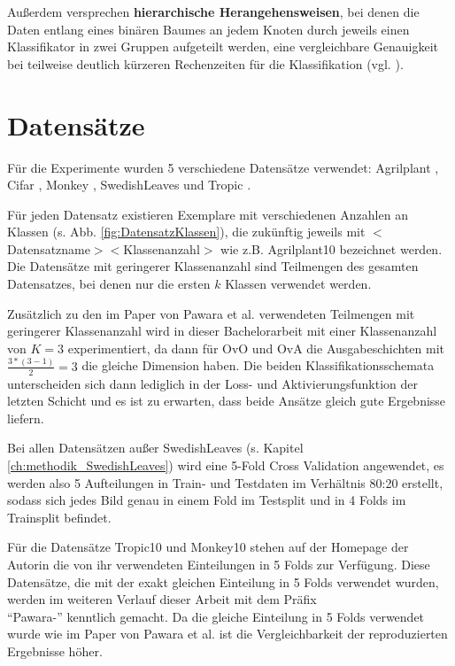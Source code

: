 Außerdem versprechen \textbf{hierarchische Herangehensweisen}, bei denen die Daten entlang eines binären Baumes an jedem Knoten durch jeweils einen Klassifikator in zwei Gruppen aufgeteilt werden, eine vergleichbare Genauigkeit bei teilweise deutlich kürzeren Rechenzeiten für die Klassifikation (vgl. \cite{hierarchischeMethoden}).

\newpage
\section{Datensätze}
\label{ch:methodik_datensaetze}
Für die Experimente wurden 5 verschiedene Datensätze verwendet: Agrilplant \cite{pawaraWebsiteDatensaetze}, Cifar \cite{cifar10}, Monkey \cite{pawaraWebsiteDatensaetze}, SwedishLeaves \cite{swedishLeaves} und Tropic \cite{pawaraWebsiteDatensaetze}.

Für jeden Datensatz existieren Exemplare mit verschiedenen Anzahlen an Klassen (s. Abb. \ref{fig:DatensatzKlassen}), die zukünftig jeweils mit $<$Datensatzname$><$Klassenanzahl$>$ wie z.B. Agrilplant10 bezeichnet werden.
Die Datensätze mit geringerer Klassenanzahl sind Teilmengen des gesamten Datensatzes, bei denen nur die ersten $k$ Klassen verwendet werden.

Zusätzlich zu den im Paper von Pawara et al. \cite{pawaraPaper} verwendeten Teilmengen mit geringerer Klassenanzahl wird in dieser Bachelorarbeit mit einer Klassenanzahl von $K=3$ experimentiert, da dann für OvO und OvA die Ausgabeschichten mit $\frac{3*(3-1)}{2} = 3$ die gleiche Dimension haben. Die beiden Klassifikationsschemata unterscheiden sich dann lediglich in der Loss- und Aktivierungsfunktion der letzten Schicht und es ist zu erwarten, dass beide Ansätze gleich gute Ergebnisse liefern.

Bei allen Datensätzen außer SwedishLeaves (s. Kapitel \ref{ch:methodik_SwedishLeaves}) wird eine 5-Fold Cross Validation angewendet, es werden also 5 Aufteilungen in Train- und Testdaten im Verhältnis 80:20 erstellt, sodass sich jedes Bild genau in einem Fold im Testsplit und in 4 Folds im Trainsplit befindet.

Für die Datensätze Tropic10 und Monkey10 stehen auf der Homepage der Autorin \cite{pawaraWebsiteDatensaetze} die von ihr verwendeten Einteilungen in 5 Folds zur Verfügung. Diese Datensätze, die mit der exakt gleichen Einteilung in 5 Folds verwendet wurden, werden im weiteren Verlauf dieser Arbeit mit dem Präfix\\ \enquote{Pawara-} kenntlich gemacht. Da die gleiche Einteilung in 5 Folds verwendet wurde wie im Paper von Pawara et al. \cite{pawaraPaper} ist die Vergleichbarkeit der reproduzierten Ergebnisse höher.

